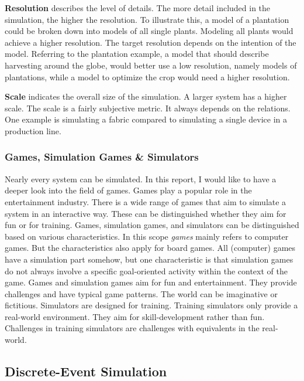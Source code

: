 \textbf{Resolution} describes the level of details. The more detail included in the simulation, the
higher the resolution. To illustrate this, a model of a plantation could be broken down into models of all single plants. Modeling all plants would achieve a higher resolution. The target resolution depends on the intention of the model. Referring to the plantation example, a model that should describe harvesting around the globe, would better use a low resolution, namely models of plantations, while a model to optimize the crop would need a higher resolution.

\textbf{Scale} indicates the overall size of the simulation. A larger system has a higher scale. The scale is a fairly subjective metric. It always depends on the relations. One example is simulating a fabric compared to simulating a single device in a production line.


\subsubsection{Games, Simulation Games \& Simulators}


Nearly every system can be simulated. In this report, I would like to have a deeper look into the field of games. Games play a popular role in the entertainment industry. There is a wide range of games that aim to simulate a system in an interactive way. These can be distinguished whether they aim for fun or for training.
Games, simulation games, and simulators can be distinguished based on various characteristics. \cite{narayanasamy2006distinguishing} In this scope \textit{games} mainly refers to computer games. But the characteristics also apply for board games.
All (computer) games have a simulation part somehow, but one characteristic is that simulation games do not always involve a specific goal-oriented activity within the context of the game. Games and simulation games aim for fun and entertainment. They provide challenges and have typical game patterns. The world can be imaginative or fictitious.
Simulators are designed for training. Training simulators only provide a real-world environment. They aim for skill-development rather than fun. Challenges in training simulators are challenges with equivalents in the real-world.



\subsection{Discrete-Event Simulation}

